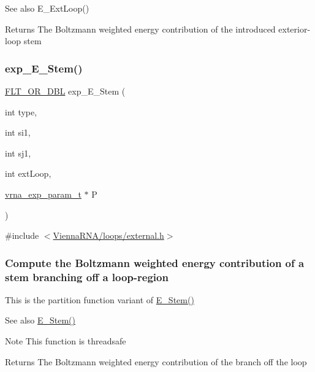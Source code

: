 \begin{DoxySeeAlso}{See also}
E\+\_\+\+Ext\+Loop() 
\end{DoxySeeAlso}
\begin{DoxyReturn}{Returns}
The Boltzmann weighted energy contribution of the introduced exterior-\/loop stem 
\end{DoxyReturn}
\mbox{\label{group__eval__deprecated_gab0aa9833ab41875a91a9be8a5ffd7092}} 
\subsubsection{\texorpdfstring{exp\_E\_Stem()}{exp\_E\_Stem()}}
{\footnotesize\ttfamily \mbox{\hyperlink{group__data__structures_ga31125aeace516926bf7f251f759b6126}{F\+L\+T\+\_\+\+O\+R\+\_\+\+D\+BL}} exp\+\_\+\+E\+\_\+\+Stem (\begin{DoxyParamCaption}\item[{int}]{type,  }\item[{int}]{si1,  }\item[{int}]{sj1,  }\item[{int}]{ext\+Loop,  }\item[{\mbox{\hyperlink{group__energy__parameters_ga01d8b92fe734df8d79a6169482c7d8d8}{vrna\+\_\+exp\+\_\+param\+\_\+t}} $\ast$}]{P }\end{DoxyParamCaption})}



{\ttfamily \#include $<$\mbox{\hyperlink{external_8h}{Vienna\+R\+N\+A/loops/external.\+h}}$>$}

\subsubsection*{Compute the Boltzmann weighted energy contribution of a stem branching off a loop-\/region}

This is the partition function variant of \mbox{\hyperlink{group__eval__deprecated_ga51f9851f3500c2aae66674142a6a2dd5}{E\+\_\+\+Stem()}} \begin{DoxySeeAlso}{See also}
\mbox{\hyperlink{group__eval__deprecated_ga51f9851f3500c2aae66674142a6a2dd5}{E\+\_\+\+Stem()}} 
\end{DoxySeeAlso}
\begin{DoxyNote}{Note}
This function is threadsafe
\end{DoxyNote}
\begin{DoxyReturn}{Returns}
The Boltzmann weighted energy contribution of the branch off the loop 
\end{DoxyReturn}
\mbox{\label{group__eval__deprecated_gaafbc187b7f78e8e82afb77dd6f3b8fc5}} 
